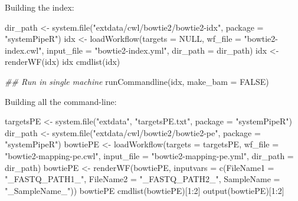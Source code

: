 \documentclass[14pt,]{article}
\newcommand{\hlnum}[1]{\textcolor[rgb]{0.816,0.125,0.439}{#1}}%
\newcommand{\hlstr}[1]{\textcolor[rgb]{0.251,0.627,0.251}{#1}}%
\newcommand{\hlcom}[1]{\textcolor[rgb]{0.502,0.502,0.502}{\textit{#1}}}%
\newcommand{\hlopt}[1]{\textcolor[rgb]{0,0,0}{#1}}%
\newcommand{\hlstd}[1]{\textcolor[rgb]{0.251,0.251,0.251}{#1}}%
\newcommand{\hlkwc}[1]{\textcolor[rgb]{0.251,0.251,0.251}{#1}}%
\newcommand{\hlkwd}[1]{\textcolor[rgb]{0.878,0.439,0.125}{#1}}%
\newenvironment{Shaded}{\begin{myshaded}}{\end{myshaded}}
\newcommand{\KeywordTok}[1]{\hlkwd{#1}}
\newcommand{\DataTypeTok}[1]{\hlkwc{#1}}
\newcommand{\DecValTok}[1]{\hlnum{#1}}
\newcommand{\StringTok}[1]{\hlstr{#1}}
\newcommand{\CommentTok}[1]{\hlcom{#1}}
\newcommand{\OtherTok}[1]{{#1}}
\newcommand{\OperatorTok}[1]{\hlopt{#1}}
\newcommand{\NormalTok}[1]{\hlstd{#1}}
\begin{document}
Building the index:

\begin{Shaded}
\begin{Highlighting}[]
\NormalTok{dir_path <-}\StringTok{ }\KeywordTok{system.file}\NormalTok{(}\StringTok{"extdata/cwl/bowtie2/bowtie2-idx"}\NormalTok{, }\DataTypeTok{package =} \StringTok{"systemPipeR"}\NormalTok{)}
\NormalTok{idx <-}\StringTok{ }\KeywordTok{loadWorkflow}\NormalTok{(}\DataTypeTok{targets =} \OtherTok{NULL}\NormalTok{, }\DataTypeTok{wf_file =} \StringTok{"bowtie2-index.cwl"}\NormalTok{, }\DataTypeTok{input_file =} \StringTok{"bowtie2-index.yml"}\NormalTok{, }
    \DataTypeTok{dir_path =}\NormalTok{ dir_path)}
\NormalTok{idx <-}\StringTok{ }\KeywordTok{renderWF}\NormalTok{(idx)}
\NormalTok{idx}
\KeywordTok{cmdlist}\NormalTok{(idx)}

\CommentTok{## Run in single machine}
\KeywordTok{runCommandline}\NormalTok{(idx, }\DataTypeTok{make_bam =} \OtherTok{FALSE}\NormalTok{)}
\end{Highlighting}
\end{Shaded}

Building all the command-line:

\begin{Shaded}
\begin{Highlighting}[]
\NormalTok{targetsPE <-}\StringTok{ }\KeywordTok{system.file}\NormalTok{(}\StringTok{"extdata"}\NormalTok{, }\StringTok{"targetsPE.txt"}\NormalTok{, }\DataTypeTok{package =} \StringTok{"systemPipeR"}\NormalTok{)}
\NormalTok{dir_path <-}\StringTok{ }\KeywordTok{system.file}\NormalTok{(}\StringTok{"extdata/cwl/bowtie2/bowtie2-pe"}\NormalTok{, }\DataTypeTok{package =} \StringTok{"systemPipeR"}\NormalTok{)}
\NormalTok{bowtiePE <-}\StringTok{ }\KeywordTok{loadWorkflow}\NormalTok{(}\DataTypeTok{targets =}\NormalTok{ targetsPE, }\DataTypeTok{wf_file =} \StringTok{"bowtie2-mapping-pe.cwl"}\NormalTok{, }
    \DataTypeTok{input_file =} \StringTok{"bowtie2-mapping-pe.yml"}\NormalTok{, }\DataTypeTok{dir_path =}\NormalTok{ dir_path)}
\NormalTok{bowtiePE <-}\StringTok{ }\KeywordTok{renderWF}\NormalTok{(bowtiePE, }\DataTypeTok{inputvars =} \KeywordTok{c}\NormalTok{(}\DataTypeTok{FileName1 =} \StringTok{"_FASTQ_PATH1_"}\NormalTok{, }\DataTypeTok{FileName2 =} \StringTok{"_FASTQ_PATH2_"}\NormalTok{, }
    \DataTypeTok{SampleName =} \StringTok{"_SampleName_"}\NormalTok{))}
\NormalTok{bowtiePE}
\KeywordTok{cmdlist}\NormalTok{(bowtiePE)[}\DecValTok{1}\OperatorTok{:}\DecValTok{2}\NormalTok{]}
\KeywordTok{output}\NormalTok{(bowtiePE)[}\DecValTok{1}\OperatorTok{:}\DecValTok{2}\NormalTok{]}
\end{Highlighting}
\end{Shaded}
\end{document}
